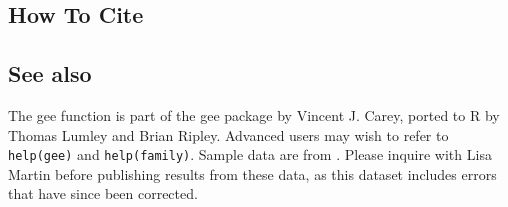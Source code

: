 \subsection*{How To Cite}




\subsection*{See also}
The gee function is part of the gee package by Vincent J. Carey, ported to R by Thomas Lumley and Brian Ripley.  Advanced users may wish to refer to \texttt{help(gee)} and \texttt{help(family)}.  Sample data are from \cite{Martin92}.  Please inquire with Lisa Martin before publishing
results from these data, as this dataset includes errors that have since
been corrected.
